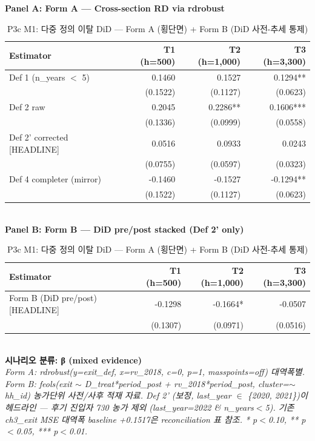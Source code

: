 \begin{table}[t]
\centering
\caption{P3c M1: 다중 정의 이탈 DiD — Form A (횡단면) + Form B (DiD 사전-추세 통제)}
\label{tab:ch5_exit_definitions_ko}
\textbf{Panel A: Form A — Cross-section RD via rdrobust}\\
\begin{tabular}{lrrr}
\toprule
Estimator & T1 (h=500) & T2 (h=1,000) & T3 (h=3,300) \\
\midrule
Def 1 (n\_years $<$ 5) & 0.1460 & 0.1527 & 0.1294** \\
       & (0.1522) & (0.1127) & (0.0623) \\
Def 2 raw & 0.2045 & 0.2286** & 0.1606*** \\
       & (0.1336) & (0.0999) & (0.0558) \\
Def 2' corrected [HEADLINE] & 0.0516 & 0.0933 & 0.0243 \\
       & (0.0755) & (0.0597) & (0.0323) \\
Def 4 completer (mirror) & -0.1460 & -0.1527 & -0.1294** \\
       & (0.1522) & (0.1127) & (0.0623) \\
\bottomrule
\end{tabular}\\[1ex]
\textbf{Panel B: Form B — DiD pre/post stacked (Def 2' only)}\\
\begin{tabular}{lrrr}
\toprule
Estimator & T1 (h=500) & T2 (h=1,000) & T3 (h=3,300) \\
\midrule
Form B (DiD pre/post) [HEADLINE] & -0.1298 & -0.1664* & -0.0507 \\
                                  & (0.1307) & (0.0971) & (0.0516) \\
\bottomrule
\end{tabular}\\[1ex]
\textbf{시나리오 분류: β (mixed evidence)}\\
\footnotesize\textit{Form A: rdrobust(y=exit\_def, x=rv\_2018, c=0, p=1, masspoints=off) 대역폭별. Form B: feols(exit $\sim$ D\_treat*period\_post + rv\_2018*period\_post, cluster=$\sim$hh\_id) 농가단위 사전/사후 적재 자료. Def 2' (보정, last\_year $\in$ \{2020, 2021\})이 헤드라인 — 후기 진입자 730 농가 제외 (last\_year=2022 \& n\_years$<$5). 기존 ch3\_exit MSE 대역폭 baseline +0.1517은 reconciliation 표 참조. * p$<$0.10, ** p$<$0.05, *** p$<$0.01.}
\end{table}

